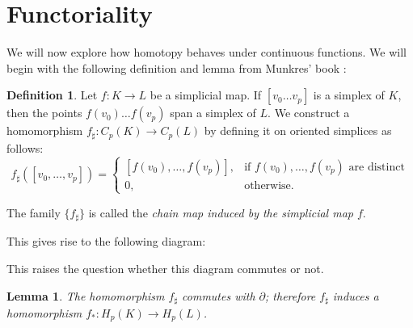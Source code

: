 \documentclass[toc=bib, headinclude]{scrartcl}
\theoremstyle{plain}
\newtheorem{lemma}[theorem]{Lemma}
\theoremstyle{definition}
\newtheorem	{definition}[theorem]{Definition}
\theoremstyle{remark}
\begin{document}
\section{Functoriality}
We will now explore how homotopy behaves under continuous functions. We will begin with the following definition and lemma from Munkres' book \cite[lemma 12.1, p. 62]{mu}:

\begin{definition}
	Let $f: K\to L$ be a simplicial map. If $[v_0\dots v_p]$ is a simplex of $K$, then the points $f(v_0)\dots f(v_p)$ span a simplex of $L$. We construct a homomorphism $f_\sharp: C_p(K)\to C_p(L)$ by defining it on oriented simplices as follows:
	\[
	f_\sharp([v_0,\dots,v_p])=\begin{cases}
	[f(v_0),\dots, f(v_p)],& \text{if } f(v_0),\dots, f(v_p) \text{ are distinct}\\
	0,&\text{otherwise}.
	\end{cases}
	\]
	
	The family $\{f_\sharp\}$ is called the \textit{chain map induced by the simplicial map $f$}.
\end{definition}

This gives rise to the following diagram:

\begin{center}
	
\end{center}

This raises the question whether this diagram commutes or not. 
\begin{lemma}
	The homomorphism $f_\sharp$ commutes with $\partial$; therefore $f_\sharp$ induces a homomorphism $f_\ast:H_p(K)\to H_p(L)$.
\end{lemma}
\end{document}
